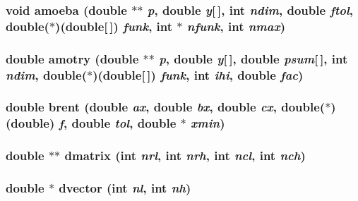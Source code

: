 \subsubsection{\setlength{\rightskip}{0pt plus 5cm}void amoeba (double $\ast$$\ast$ {\em p}, double {\em y}[$\,$], int {\em ndim}, double {\em ftol}, double($\ast$)(double[$\,$]) {\em funk}, int $\ast$ {\em nfunk}, int {\em nmax})}\label{nrminmd_8c_c0567ca4c726bf8ffe9a0e182ca0b5cc}


\subsubsection{\setlength{\rightskip}{0pt plus 5cm}double amotry (double $\ast$$\ast$ {\em p}, double {\em y}[$\,$], double {\em psum}[$\,$], int {\em ndim}, double($\ast$)(double[$\,$]) {\em funk}, int {\em ihi}, double {\em fac})}\label{nrminmd_8c_f5b85260cf99fa6442fdf0a9f4eb6d46}


\subsubsection{\setlength{\rightskip}{0pt plus 5cm}double brent (double {\em ax}, double {\em bx}, double {\em cx}, double($\ast$)(double) {\em f}, double {\em tol}, double $\ast$ {\em xmin})}\label{nrminmd_8c_4fd8796511d2de86aee49722d758b5b6}


\subsubsection{\setlength{\rightskip}{0pt plus 5cm}double $\ast$$\ast$ dmatrix (int {\em nrl}, int {\em nrh}, int {\em ncl}, int {\em nch})}\label{nrminmd_8c_9829823d1fef07b2a9636d185a61cfa8}


\subsubsection{\setlength{\rightskip}{0pt plus 5cm}double $\ast$ dvector (int {\em nl}, int {\em nh})}\label{nrminmd_8c_adf545b87862c6aa65798a2937ffc0e9}


